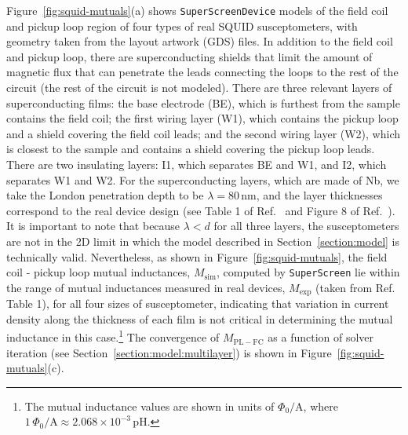 \documentclass[final,3p,times,twocolumn]{elsarticle}
\newcommand{\inline}[1]{\texttt{#1}\xspace}
\newcommand{\SuperScreen}{\inline{SuperScreen}}
\newcommand{\nm}{\mathrm{nm}}
\begin{document}
Figure~\ref{fig:squid-mutuals}(a) shows \SuperScreen \inline{Device} models of the field coil and pickup loop region of four types of real SQUID susceptometers, with geometry taken from the layout artwork (GDS) files. In addition to the field coil and pickup loop, there are superconducting shields that limit the amount of magnetic flux that can penetrate the leads connecting the loops to the rest of the circuit (the rest of the circuit is not modeled). There are three relevant layers of superconducting films: the base electrode (BE), which is furthest from the sample contains the field coil; the first wiring layer (W1), which contains the pickup loop and a shield covering the field coil leads; and the second wiring layer (W2), which is closest to the sample and contains a shield covering the pickup loop leads. There are two insulating layers: I1, which separates BE and W1, and I2, which separates W1 and W2.
For the superconducting layers, which are made of Nb, we take the London penetration depth to be $\lambda = 80\,\nm$, and the layer thicknesses correspond to the real device design (see Table 1 of Ref.~\cite{Kirtley2016-gt} and Figure 8 of Ref.~\cite{Kirtley2016-zz}). It is important to note that because $\lambda < d$ for all three layers, the susceptometers are not in the 2D limit in which the model described in Section~\ref{section:model} is technically valid. Nevertheless, as shown in Figure~\ref{fig:squid-mutuals}, the field coil - pickup loop mutual inductances, $M_\mathrm{sim}$, computed by \SuperScreen lie within the range of mutual inductances measured in real devices, $M_\mathrm{exp}$ (taken from Ref.~\cite{Kirtley2016-zz} Table 1), for all four sizes of susceptometer, indicating that variation in current density along the thickness of each film is not critical in determining the mutual inductance in this case.\footnote{The mutual inductance values are shown in units of $\Phi_0 / \mathrm{A}$, where $1\,\Phi_0 / \mathrm{A}\approx2.068\times10^{-3}\,\mathrm{pH}$.} The convergence of $M_\mathrm{PL-FC}$ as a function of solver iteration (see Section~\ref{section:model:multilayer}) is shown in Figure~\ref{fig:squid-mutuals}(c).
\end{document}
